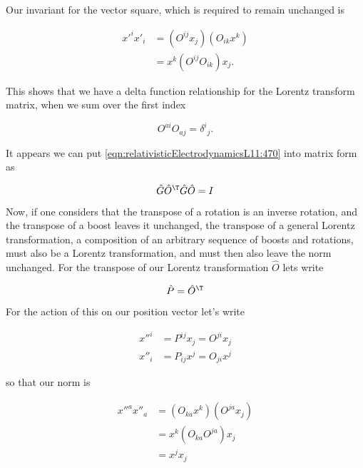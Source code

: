 Our invariant for the vector square, which is required to remain unchanged is

\begin{align*}
{x'}^i {x'}_i 
&= (O^{i j} x_j)(O_{i k} x^k) \\
&= x^k (O^{i j} O_{i k}) x_j.
\end{align*}

This shows that we have a delta function relationship for the Lorentz transform matrix, when we sum over the first index

\begin{equation}\label{eqn:relativisticElectrodynamicsL11:470}
O^{a i} O_{a j} = {\delta^i}_j.
\end{equation}

It appears we can put \ref{eqn:relativisticElectrodynamicsL11:470} into matrix form as

\begin{equation}\label{eqn:relativisticElectrodynamicsL11:471}
\hat{G} \hat{O}^\T \hat{G} \hat{O} = I
\end{equation}

Now, if one considers that the transpose of a rotation is an inverse rotation, and the transpose of a boost leaves it unchanged, the transpose of a general Lorentz transformation, a composition of an arbitrary sequence of boosts and rotations, must also be a Lorentz transformation, and must then also leave the norm unchanged.  For the transpose of our Lorentz transformation $\hat{O}$ lets write

\begin{equation}\label{eqn:relativisticElectrodynamicsL11:1000}
\hat{P} = \hat{O}^\T
\end{equation}

For the action of this on our position vector let's write

\begin{align}\label{eqn:relativisticElectrodynamicsL11:1020}
{x''}^i &= P^{i j} x_j = O^{j i} x_j \\
{x''}_i &= P_{i j} x^j = O_{j i} x^j
\end{align}

so that our norm is

\begin{align*}
{x''}^a {x''}_a 
&= (O_{k a} x^k)(O^{j a} x_j) \\
&= x^k (O_{k a} O^{j a} ) x_j \\
&= x^j x_j \\
\end{align*}

